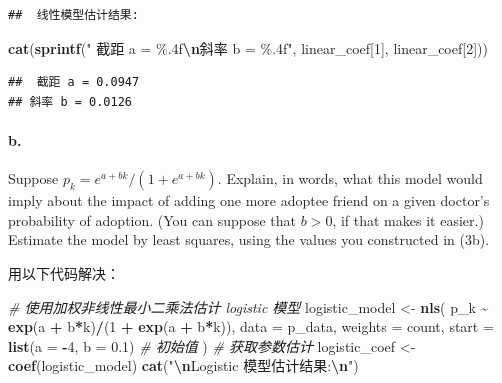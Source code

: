 \documentclass[
]{article}
\newenvironment{Shaded}{\begin{snugshade}}{\end{snugshade}}
\newcommand{\AttributeTok}[1]{\textcolor[rgb]{0.13,0.29,0.53}{#1}}
\newcommand{\CommentTok}[1]{\textcolor[rgb]{0.56,0.35,0.01}{\textit{#1}}}
\newcommand{\DecValTok}[1]{\textcolor[rgb]{0.00,0.00,0.81}{#1}}
\newcommand{\FloatTok}[1]{\textcolor[rgb]{0.00,0.00,0.81}{#1}}
\newcommand{\FunctionTok}[1]{\textcolor[rgb]{0.13,0.29,0.53}{\textbf{#1}}}
\newcommand{\NormalTok}[1]{#1}
\newcommand{\OtherTok}[1]{\textcolor[rgb]{0.56,0.35,0.01}{#1}}
\newcommand{\SpecialCharTok}[1]{\textcolor[rgb]{0.81,0.36,0.00}{\textbf{#1}}}
\newcommand{\StringTok}[1]{\textcolor[rgb]{0.31,0.60,0.02}{#1}}
\begin{document}
\begin{verbatim}
##  线性模型估计结果:
\end{verbatim}

\begin{Shaded}
\begin{Highlighting}[]
\FunctionTok{cat}\NormalTok{(}\FunctionTok{sprintf}\NormalTok{(}\StringTok{" 截距 a = \%.4f}\SpecialCharTok{\textbackslash{}n}\StringTok{斜率 b = \%.4f"}\NormalTok{, linear\_coef[}\DecValTok{1}\NormalTok{], linear\_coef[}\DecValTok{2}\NormalTok{]))}
\end{Highlighting}
\end{Shaded}

\begin{verbatim}
##  截距 a = 0.0947
## 斜率 b = 0.0126
\end{verbatim}

\paragraph{b.}\label{b.-1}

Suppose \(p_k = e^{a+bk}/(1+e^{a+bk})\). Explain, in words, what this
model would imply about the impact of adding one more adoptee friend on
a given doctor's probability of adoption. (You can suppose that
\(b > 0\), if that makes it easier.) Estimate the model by least
squares, using the values you constructed in (3b).

用以下代码解决：

\begin{Shaded}
\begin{Highlighting}[]
\CommentTok{\# 使用加权非线性最小二乘法估计 logistic 模型}
\NormalTok{logistic\_model }\OtherTok{\textless{}{-}} \FunctionTok{nls}\NormalTok{(}
\NormalTok{p\_k }\SpecialCharTok{\textasciitilde{}} \FunctionTok{exp}\NormalTok{(a }\SpecialCharTok{+}\NormalTok{ b}\SpecialCharTok{*}\NormalTok{k)}\SpecialCharTok{/}\NormalTok{(}\DecValTok{1} \SpecialCharTok{+} \FunctionTok{exp}\NormalTok{(a }\SpecialCharTok{+}\NormalTok{ b}\SpecialCharTok{*}\NormalTok{k)),}
\AttributeTok{data =}\NormalTok{ p\_data,}
\AttributeTok{weights =}\NormalTok{ count,}
\AttributeTok{start =} \FunctionTok{list}\NormalTok{(}\AttributeTok{a =} \SpecialCharTok{{-}}\DecValTok{4}\NormalTok{, }\AttributeTok{b =} \FloatTok{0.1}\NormalTok{) }\CommentTok{\# 初始值}
\NormalTok{)}
\CommentTok{\# 获取参数估计}
\NormalTok{logistic\_coef }\OtherTok{\textless{}{-}} \FunctionTok{coef}\NormalTok{(logistic\_model)}
\FunctionTok{cat}\NormalTok{(}\StringTok{"}\SpecialCharTok{\textbackslash{}n}\StringTok{Logistic 模型估计结果:}\SpecialCharTok{\textbackslash{}n}\StringTok{"}\NormalTok{)}
\end{Highlighting}
\end{Shaded}
\end{document}
